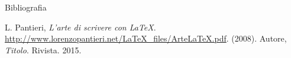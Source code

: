 \documentclass[xcolor={dvipsnames}]{beamer}
\begin{document}

\begin{frame}{Bibliografia}
    \begin{thebibliography}{artelatex}
	 L. Pantieri, \emph{L'arte di scrivere con \LaTeX}. \url{http://www.lorenzopantieri.net/LaTeX_files/ArteLaTeX.pdf}. (2008).
	 Autore, \emph{Titolo}. Rivista. 2015.
    \end{thebibliography}
\end{frame}
\end{document}

